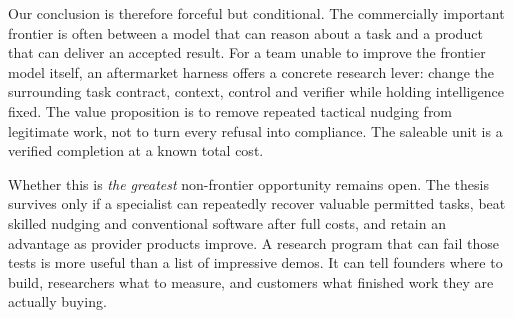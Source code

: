Our conclusion is therefore forceful but conditional. The commercially important frontier is often between a model that can reason about a task and a product that can deliver an accepted result. For a team unable to improve the frontier model itself, an aftermarket harness offers a concrete research lever: change the surrounding task contract, context, control and verifier while holding intelligence fixed. The value proposition is to remove repeated tactical nudging from legitimate work, not to turn every refusal into compliance. The saleable unit is a verified completion at a known total cost.

Whether this is \emph{the greatest} non-frontier opportunity remains open. The thesis survives only if a specialist can repeatedly recover valuable permitted tasks, beat skilled nudging and conventional software after full costs, and retain an advantage as provider products improve. A research program that can fail those tests is more useful than a list of impressive demos. It can tell founders where to build, researchers what to measure, and customers what finished work they are actually buying.
